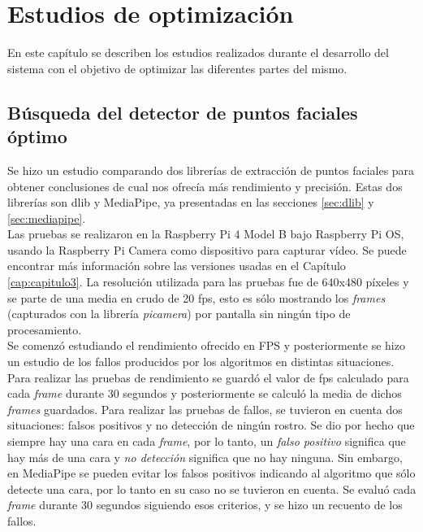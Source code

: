 \chapter{Estudios de optimización}
\label{cap:capitulo5}

En este capítulo se describen los estudios realizados durante el desarrollo del sistema con el objetivo de optimizar las diferentes partes del mismo.

\section{Búsqueda del detector de puntos faciales óptimo}
\label{sec:estudio_puntos_faciales}

Se hizo un estudio comparando dos librerías de extracción de puntos faciales para obtener conclusiones de cual nos ofrecía más rendimiento y precisión. Estas dos librerías son dlib y MediaPipe, ya presentadas en las secciones \ref{sec:dlib} y \ref{sec:mediapipe}.\\

Las pruebas se realizaron en la Raspberry Pi 4 Model B bajo Raspberry Pi OS, usando la Raspberry Pi Camera como dispositivo para capturar vídeo. Se puede encontrar más información sobre las versiones usadas en el Capítulo \ref{cap:capitulo3}. La resolución utilizada para las pruebas fue de 640x480 píxeles y se parte de una media en crudo de 20 fps, esto es sólo mostrando los \textit{frames} (capturados con la librería \textit{picamera}) por pantalla sin ningún tipo de procesamiento.\\

Se comenzó estudiando el rendimiento ofrecido en FPS y posteriormente se hizo un estudio de los fallos producidos por los algoritmos en distintas situaciones. Para realizar las pruebas de rendimiento se guardó el valor de fps calculado para cada \textit{frame} durante 30 segundos y posteriormente se calculó la media de dichos \textit{frames} guardados. Para realizar las pruebas de fallos, se tuvieron en cuenta dos situaciones: falsos positivos y no detección de ningún rostro. Se dio por hecho que siempre hay una cara en cada \textit{frame}, por lo tanto, un \textit{falso positivo} significa que hay más de una cara y \textit{no detección} significa que no hay ninguna. Sin embargo, en MediaPipe se pueden evitar los falsos positivos indicando al algoritmo que sólo detecte una cara, por lo tanto en su caso no se tuvieron en cuenta. Se evaluó cada \textit{frame} durante 30 segundos siguiendo esos criterios, y se hizo un recuento de los fallos.

